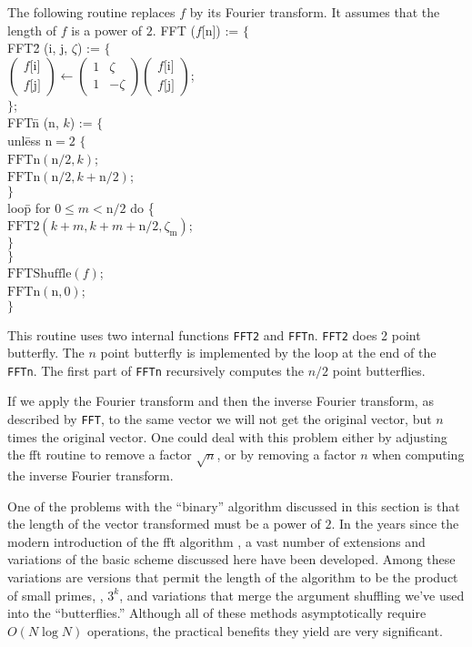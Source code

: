 The following routine replaces $f$ by its Fourier transform.  It
assumes that the length of $f$ is a power of $2$.
\begindsacode
FFT ($f$[n]) := $\{$ \\
\> FFT\=2 (i, j, $\zeta$) := $\{$ \\
\>\> $\left(\!\!\!\begin{array}{c}f\mbox{[i]}\\f\mbox{[j]}\end{array}\!\!\!\right)
  \leftarrow \left(\!\!\!\begin{array}{cc}1 & \zeta\\ 1 & -\zeta\end{array}\!\!\!\right)
  \left(\!\!\!\begin{array}{c}f\mbox{[i]}\\f\mbox{[j]}\end{array}\!\!\!\right)$;\\
\>\> $\}$; \\
\> FFT\=n (n, $k$) := $\{$ \\
\>\> unl\=ess $\mbox{n} = 2$ $\{$ \\
\>\>\> $\mbox{FFTn}(\mbox{n}/2, k)$;\\
\>\>\> $\mbox{FFTn}(\mbox{n}/2, k + \mbox{n}/2)$;\\
\>\>\> $\}$\\
\>\> loo\=p for $0 \le m < \mbox{n}/2$ do \{ \\
\>\>\> $\mbox{FFT2}(k+m, k+m+\mbox{n}/2, \zeta_{\mbox{m}})$; \\
\>\>\> $\}$ \\
\>\> $\}$ \\
\> $\mbox{FFTShuffle}(f)$; \\
\> $\mbox{FFTn}(\mbox{n}, 0)$; \\
\> $\}$
\enddsacode

\noindent
This routine uses two internal functions {\tt FFT2} and {\tt FFTn}.
{\tt FFT2} does 2 point butterfly.  The $n$ point butterfly is
implemented by the loop at the end of the {\tt FFTn}.  The first part
of {\tt FFTn} recursively computes the $n/2$ point butterflies.  

If we apply the Fourier transform and then the inverse Fourier
transform, as described by {\tt FFT}, to the same vector we will not
get the original vector, but $n$ times the original vector.  One
could deal with this problem either by adjusting the {\sc fft} routine
to remove a factor $\sqrt{n}$, or by removing a factor $n$ when
computing the inverse Fourier transform.

\medskip
One of the problems with the ``binary'' algorithm discussed in this
section is that the length of the vector transformed must be a power
of $2$.  In the years since the modern introduction of the {\sc fft}
algorithm \cite{Cooley65}, a vast number of extensions and variations
of the basic scheme discussed here have been developed.  Among these
variations are versions that permit the length of the algorithm to be
the product of small primes, \eg, $3^k$, and variations that merge the
argument shuffling we've used into the ``butterflies.''  Although all
of these methods asymptotically require $O(N \log N)$ operations, the
practical benefits they yield are very significant.

